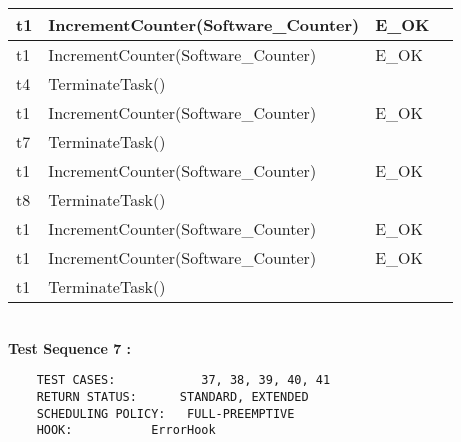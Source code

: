 \documentclass[10pt]{article}
\newlength{\Li}\settowidth{\Li}{Running}
\newlength{\Lii}\setlength{\Lii}{7cm}
\newlength{\Liiii}\setlength{\Liiii}{0.9cm}
\newlength{\Liii}\setlength{\Liii}{\textwidth} \addtolength{\Liii}{-\Li} \addtolength{\Liii}{-\Lii} \addtolength{\Liii}{-\Liiii}
\begin{document}
\begin{supertabular}{|p{\Li}|p{\Lii}|p{\Liii}|p{\Liiii}|}
	t1		& IncrementCounter(Software\_Counter)										& E\_OK												& \\ \hline
	t1		& IncrementCounter(Software\_Counter)										& E\_OK												& \\ \hline
	t4		& TerminateTask()														& 													& \\ \hline

	t1		& IncrementCounter(Software\_Counter)										& E\_OK												& \\ \hline
	t7		& TerminateTask()														& 													& \\ \hline

	t1		& IncrementCounter(Software\_Counter)										& E\_OK												& \\ \hline
	t8		& TerminateTask()														& 													& \\ \hline
	
	t1		& IncrementCounter(Software\_Counter)										& E\_OK												& \\ \hline
	t1		& IncrementCounter(Software\_Counter)										& E\_OK												& \\ \hline
	t1		& TerminateTask()														& 													& \\ \hline
	\end{supertabular}\\
	
	
	\textbf{Test Sequence 7 :}
	\begin{lstlisting}
	TEST CASES:		       37, 38, 39, 40, 41
	RETURN STATUS:	  	STANDARD, EXTENDED
	SCHEDULING POLICY:   FULL-PREEMPTIVE
	HOOK:			ErrorHook
	\end{lstlisting}
	
\end{document}
